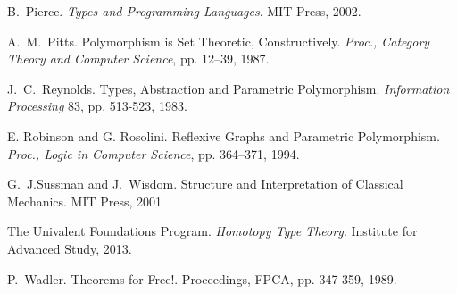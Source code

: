 \documentclass[preprint]{sigplanconf}
\theoremstyle{examplestyle}
\begin{document}
\begin{thebibliography}{12}
 B.~Pierce. {\em Types and Programming
  Languages}. MIT Press, 2002.

 A.~M.~Pitts.  Polymorphism is Set
  Theoretic, Constructively.  {\em Proc., Category Theory and Computer
    Science}, pp. 12--39, 1987.

J.~C.~Reynolds. Types, Abstraction and Parametric Polymorphism.
{\em Information Processing} 83, pp. 513-523, 1983.

 E. Robinson and G. Rosolini.  Reflexive
Graphs and Parametric Polymorphism.  {\em Proc., Logic in Computer
  Science}, pp. 364--371, 1994.

 G.~J.Sussman and J.~Wisdom. Structure and
  Interpretation of Classical Mechanics. MIT Press, 2001

 The Univalent Foundations Program. {\em
    Homotopy Type Theory}. Institute for Advanced Study, 2013.

P.~Wadler.  Theorems for Free!.  Proceedings, FPCA,
pp. 347-359, 1989.

\end{thebibliography}
\end{document}

